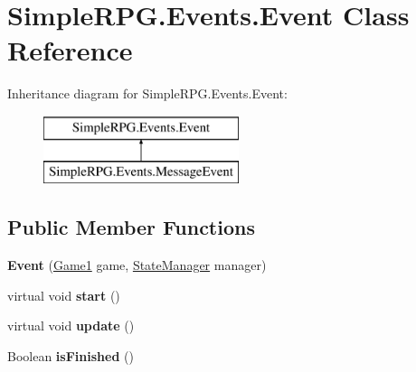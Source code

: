 \hypertarget{class_simple_r_p_g_1_1_events_1_1_event}{\section{Simple\+R\+P\+G.\+Events.\+Event Class Reference}
\label{class_simple_r_p_g_1_1_events_1_1_event}
}
Inheritance diagram for Simple\+R\+P\+G.\+Events.\+Event\+:\begin{figure}[H]
\begin{center}
\leavevmode
\includegraphics[height=2.000000cm]{class_simple_r_p_g_1_1_events_1_1_event}
\end{center}
\end{figure}
\subsection*{Public Member Functions}
\begin{DoxyCompactItemize}
\item 
\hypertarget{class_simple_r_p_g_1_1_events_1_1_event_ab7dfb6fbd4e0d5f9489bab5a7c129230}{{\bfseries Event} (\hyperlink{class_simple_r_p_g_1_1_game1}{Game1} game, \hyperlink{class_simple_r_p_g_1_1_states_1_1_state_manager}{State\+Manager} manager)}\label{class_simple_r_p_g_1_1_events_1_1_event_ab7dfb6fbd4e0d5f9489bab5a7c129230}

\item 
\hypertarget{class_simple_r_p_g_1_1_events_1_1_event_ad2ba4008dc240e6f5112def47a7239bd}{virtual void {\bfseries start} ()}\label{class_simple_r_p_g_1_1_events_1_1_event_ad2ba4008dc240e6f5112def47a7239bd}

\item 
\hypertarget{class_simple_r_p_g_1_1_events_1_1_event_af827a485fcc3cd3e52a3ecd306bf0c57}{virtual void {\bfseries update} ()}\label{class_simple_r_p_g_1_1_events_1_1_event_af827a485fcc3cd3e52a3ecd306bf0c57}

\item 
\hypertarget{class_simple_r_p_g_1_1_events_1_1_event_aaa5a7c0b6f04cd6564be3bcd69621279}{Boolean {\bfseries is\+Finished} ()}\label{class_simple_r_p_g_1_1_events_1_1_event_aaa5a7c0b6f04cd6564be3bcd69621279}

\end{DoxyCompactItemize}
